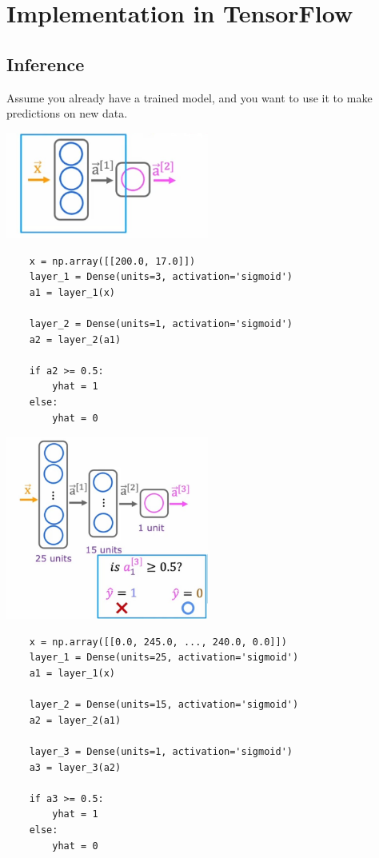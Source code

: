 \section{Implementation in TensorFlow}
\subsection*{Inference}
Assume you already have a trained model, and you want to use it to make predictions on new data.\par
\begin{center}
    \includegraphics*[width=0.5\textwidth]{images/tf (4)}
\end{center}
\begin{verbatim}
    x = np.array([[200.0, 17.0]])
    layer_1 = Dense(units=3, activation='sigmoid')
    a1 = layer_1(x)

    layer_2 = Dense(units=1, activation='sigmoid')
    a2 = layer_2(a1)

    if a2 >= 0.5:
        yhat = 1
    else:
        yhat = 0
\end{verbatim}

\begin{center}
    \includegraphics*[width=0.5\textwidth]{images/tf (1)}
\end{center}
\begin{verbatim}
    x = np.array([[0.0, 245.0, ..., 240.0, 0.0]])
    layer_1 = Dense(units=25, activation='sigmoid')
    a1 = layer_1(x)

    layer_2 = Dense(units=15, activation='sigmoid')
    a2 = layer_2(a1)

    layer_3 = Dense(units=1, activation='sigmoid')
    a3 = layer_3(a2)

    if a3 >= 0.5:
        yhat = 1
    else:
        yhat = 0
\end{verbatim}

